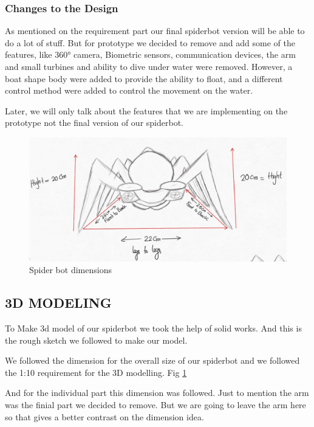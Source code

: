 \documentclass[10pt,journal,compsoc]{IEEEtran}
\begin{document}
\subsubsection{Changes to the  Design}

As mentioned on the requirement part our final spiderbot version will be able to do a lot of stuff. But for prototype we decided to remove and add some of the features, like 360° camera, Biometric sensors, communication devices, the arm and small turbines and ability to dive under water were removed. However, a boat shape body were added to provide the ability to float, and a different control method were added to control the movement on the water.

Later, we will only talk about the features that we are implementing on the prototype not the final version of our spiderbot.

\begin{figure}[h]
\includegraphics[scale=0.158]{spidermodel}
\caption{Spider bot dimensions}
\label{fig:spidermodel}
\end{figure}

\subsection{3D MODELING}

To Make 3d model of our spiderbot we took the help of solid works. And this is the rough sketch we followed to make our model.

We followed the dimension for the overall size of our spiderbot and we followed the 1:10 requirement for the 3D modelling. Fig \ref{fig:spidermodel}

And for the individual part this dimension was followed. Just to mention the arm was the finial part we decided to remove. But we are going to leave the arm here so that gives a better contrast on the dimension idea.
\end{document}
